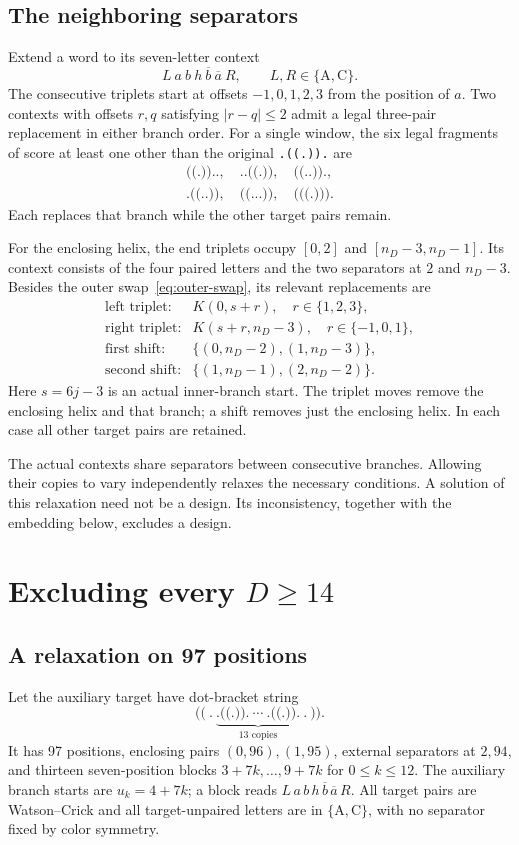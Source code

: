 \documentclass[11pt,a4paper]{article}
\theoremstyle{definition}
\newcommand{\AC}{\{\mathrm A,\mathrm C\}}
\begin{document}
\subsection{The neighboring separators}
Extend a word to its seven-letter context
\[
 L\ a\ b\ h\ \overline b\ \overline a\ R,\qquad L,R\in\AC.
\]
The consecutive triplets start at offsets $-1,0,1,2,3$ from the
position of $a$. Two contexts with offsets $r,q$ satisfying
$|r-q|\leq2$ admit a legal three-pair replacement in either branch
order. For a single window, the six legal fragments of score at
least one other than the original \texttt{.((.)).} are
\[
\begin{gathered}
 \texttt{((.))..},\quad\texttt{..((.))},\quad\texttt{((..)).},\\
 \texttt{.((..))},\quad\texttt{((...))},\quad\texttt{(((.)))}.
\end{gathered}
\]
Each replaces that branch while the other target pairs remain.

For the enclosing helix, the end triplets occupy $[0,2]$ and
$[n_D-3,n_D-1]$. Its context consists of the four paired letters and
the two separators at $2$ and $n_D-3$. Besides the outer
swap~\eqref{eq:outer-swap}, its relevant replacements are
\[
\begin{array}{ll}
 \text{left triplet:} & K(0,s+r),\quad r\in\{1,2,3\},\\
 \text{right triplet:} & K(s+r,n_D-3),\quad r\in\{-1,0,1\},\\
 \text{first shift:} & \{(0,n_D-2),(1,n_D-3)\},\\
 \text{second shift:} & \{(1,n_D-1),(2,n_D-2)\}.
\end{array}
\]
Here $s=6j-3$ is an actual inner-branch start. The triplet moves remove
the enclosing helix and that branch; a shift removes just the enclosing
helix. In each case all other target pairs are retained.

The actual contexts share separators between consecutive branches.
Allowing their copies to vary independently relaxes the necessary
conditions. A solution of this relaxation need not be a design.
Its inconsistency, together with the embedding below, excludes a design.

\section{Excluding every \texorpdfstring{$D\geq14$}{D >= 14}}\label{sec:upper}
\subsection{A relaxation on 97 positions}
Let the auxiliary target have dot-bracket string
\[
 \texttt{((}\ \texttt{.}\
 \underbrace{\texttt{.((.)).}\ \cdots\ \texttt{.((.)).}}_{13\text{ copies}}
 \ \texttt{.}\ \texttt{))}.
\]
It has 97 positions, enclosing pairs $(0,96),(1,95)$, external
separators at $2,94$, and thirteen seven-position blocks
$3+7k,\ldots,9+7k$ for $0\leq k\leq12$.
The auxiliary branch starts are $u_k=4+7k$; a block reads
$L\,a\,b\,h\,\overline b\,\overline a\,R$.
All target pairs are Watson--Crick and all target-unpaired letters are
in $\AC$, with no separator fixed by color symmetry.
\end{document}
